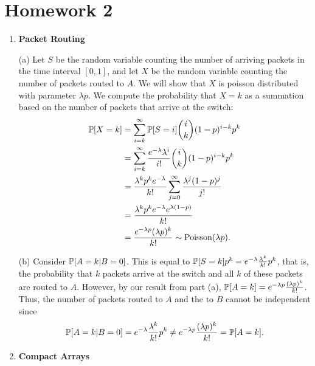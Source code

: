 \section{Homework 2}

\begin{enumerate}
    \item \textbf{Packet Routing}
    
    (a) Let $S$ be the random variable counting the number of arriving packets in the time interval $[0, 1]$, and let $X$ be the random variable counting the number of packets routed to $A$. We will show that $X$ is poisson distributed with parameter $\lambda p$. We compute the probability that $X = k$ as a summation based on the number of packets that arrive at the switch:
    \begin{align*}
        \P[X = k] &= \sum\limits_{i = k}^\infty \P[S = i]\binom{i}{k}(1 - p)^{i - k}p^k \\
            &= \sum\limits_{i = k}^\infty \frac{e^{-\lambda}\lambda^i}{i!}\binom{i}{k}(1 - p)^{i - k}p^k \\
            &= \frac{\lambda^k p^k e^{-\lambda}}{k!}\sum\limits_{j = 0}^\infty \frac{\lambda^j(1 - p)^j}{j!} \\
            &= \frac{\lambda^k p^k e^{-\lambda}e^{\lambda(1 - p)}}{k!} \\
            &= \frac{e^{-\lambda p}(\lambda p)^k}{k!} \sim \f{Poisson}(\lambda p).
    \end{align*}
    
    (b) Consider $\P[A = k | B = 0]$. This is equal to $\P[S = k]p^k = e^{-\lambda}\frac{\lambda^k}{k!}p^k$, that is, the probability that $k$ packets arrive at the switch and all $k$ of these packets are routed to $A$. However, by our result from part (a), $\P[A = k] = e^{-\lambda p}\frac{(\lambda p)^k}{k!}$. Thus, the number of packets routed to $A$ and the to $B$ cannot be independent since
    \[
    \P[A = k | B = 0] = e^{-\lambda}\frac{\lambda^k}{k!}p^k \neq e^{-\lambda p}\frac{(\lambda p)^k}{k!} = \P[A = k].
    \]
    
    \item \textbf{Compact Arrays}
    

\end{enumerate}
